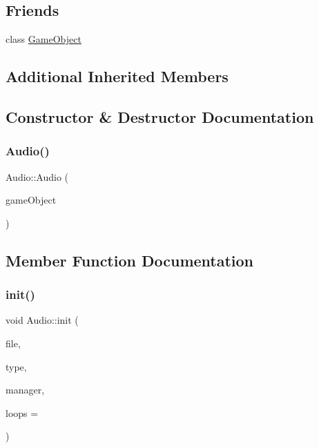 \subsection*{Friends}
\begin{DoxyCompactItemize}
\item 
class \hyperlink{class_mason_1_1_audio_a00df87c957d8f7ee0fc51f07a0542f4a}{Game\+Object}
\end{DoxyCompactItemize}
\subsection*{Additional Inherited Members}


\subsection{Constructor \& Destructor Documentation}
\hypertarget{class_mason_1_1_audio_aa65245dcba1c0a373b7130e7e36306c2}{}\label{class_mason_1_1_audio_aa65245dcba1c0a373b7130e7e36306c2} 
\subsubsection{\texorpdfstring{Audio()}{Audio()}}
{\footnotesize\ttfamily Audio\+::\+Audio (\begin{DoxyParamCaption}\item[{std\+::shared\+\_\+ptr$<$ \hyperlink{class_mason_1_1_game_object}{Game\+Object} $>$}]{game\+Object }\end{DoxyParamCaption})\hspace{0.3cm}{\ttfamily [protected]}}



\subsection{Member Function Documentation}
\hypertarget{class_mason_1_1_audio_a5d4f318f5bee0b59d1a4289495b01b4c}{}\label{class_mason_1_1_audio_a5d4f318f5bee0b59d1a4289495b01b4c} 
\subsubsection{\texorpdfstring{init()}{init()}}
{\footnotesize\ttfamily void Audio\+::init (\begin{DoxyParamCaption}\item[{std\+::string}]{file,  }\item[{\hyperlink{namespace_mason_a158d651086d1ba1aacc4c37125b27657}{Sound\+Type}}]{type,  }\item[{\hyperlink{class_mason_1_1_audio_manager}{Audio\+Manager} $\ast$}]{manager,  }\item[{int}]{loops = {} }\end{DoxyParamCaption})}

